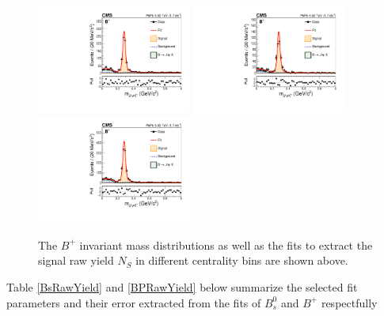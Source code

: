 \begin{figure}[h]
\begin{center}
\includegraphics[width= 0.45\textwidth]{Figures/Chapter5/data_PbPb_1_Bpt_1050_doubly0_0_30_ntKp.pdf}
\includegraphics[width= 0.45\textwidth]{Figures/Chapter5/data_PbPb_1_Bpt_1050_doubly0_30_90_ntKp.pdf}
\includegraphics[width= 0.45\textwidth]{Figures/Chapter5/data_PbPb_1_Bpt_1050_doubly0_0_90_ntKp.pdf}
\caption{The $B^+$ invariant mass distributions as well as the fits to extract the signal raw yield $N_{S}$ in different centrality bins are shown above.}
\label{BPMassCent}
\end{center}
\end{figure}

Table \ref{BsRawYield} and \ref{BPRawYield} below summarize the selected fit parameters and their error extracted from the fits of $B^0_s$ and $B^+$ respectfully



